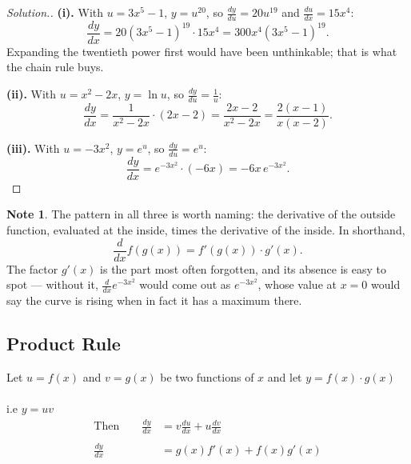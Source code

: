 \documentclass[11pt,a4paper]{article}
\theoremstyle{definition}
\newtheorem{note}[thm]{Note}
\newenvironment{solution}
  {\renewcommand{\qedsymbol}{}\begin{proof}[\textit{Solution}.]}
  {\end{proof}}
\begin{document}
\begin{solution}
\textbf{(i).} With $u=3x^{5}-1$, $y=u^{20}$, so $\frac{dy}{du}=20u^{19}$ and
$\frac{du}{dx}=15x^{4}$:
$$\frac{dy}{dx}=20\left(3x^{5}-1\right)^{19}\cdot 15x^{4}
=300x^{4}\left(3x^{5}-1\right)^{19}.$$
Expanding the twentieth power first would have been unthinkable; that is what the
chain rule buys.

\textbf{(ii).} With $u=x^{2}-2x$, $y=\ln u$, so $\frac{dy}{du}=\frac{1}{u}$:
$$\frac{dy}{dx}=\frac{1}{x^{2}-2x}\cdot(2x-2)=\frac{2x-2}{x^{2}-2x}
=\frac{2(x-1)}{x(x-2)} .$$

\textbf{(iii).} With $u=-3x^{2}$, $y=e^{u}$, so $\frac{dy}{du}=e^{u}$:
$$\frac{dy}{dx}=e^{-3x^{2}}\cdot(-6x)=-6x\,e^{-3x^{2}} .$$
\end{solution}

\begin{note}
The pattern in all three is worth naming: the derivative of the outside function,
evaluated at the inside, times the derivative of the inside. In shorthand,
$$\frac{d}{dx}f\left(g(x)\right)=f'\left(g(x)\right)\cdot g'(x).$$
The factor $g'(x)$ is the part most often forgotten, and its absence is easy to
spot --- without it, $\frac{d}{dx}e^{-3x^{2}}$ would come out as $e^{-3x^{2}}$,
whose value at $x=0$ would say the curve is rising when in fact it has a maximum
there.
\end{note}
\subsection{Product Rule}
Let $u=f(x)$ and $v=g(x)$ be two functions of $x$ and let $y=f(x)\cdot g(x)$\\\\
i.e $y=uv$\\

\begin{align*}
\text{Then}\qquad  \frac{dy}{dx} &=v \frac{du}{dx}+u \frac{dv}{dx}\\\\
\frac{dy}{dx} &= g(x) f'(x) + f(x) g'(x)\\
\end{align*}
\end{document}

